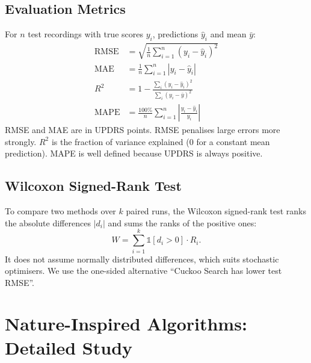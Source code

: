 \documentclass[12pt,a4paper]{article}
\numberwithin{equation}{section}
\numberwithin{table}{section}
\numberwithin{figure}{section}
\newcommand{\RMSE}{\mathrm{RMSE}}
\begin{document}
\subsection{Evaluation Metrics}
For $n$ test recordings with true scores $y_i$, predictions $\hat{y}_i$ and mean $\bar{y}$:
\begin{align}
  \RMSE &= \sqrt{\frac{1}{n}\sum_{i=1}^{n} (y_i - \hat{y}_i)^2} \\
  \mathrm{MAE} &= \frac{1}{n}\sum_{i=1}^{n} |y_i - \hat{y}_i| \\
  R^2 &= 1 - \frac{\sum_{i}(y_i - \hat{y}_i)^2}{\sum_{i}(y_i - \bar{y})^2} \\
  \mathrm{MAPE} &= \frac{100\%}{n}\sum_{i=1}^{n} \left| \frac{y_i - \hat{y}_i}{y_i} \right|
\end{align}
RMSE and MAE are in UPDRS points. RMSE penalises large errors more strongly. $R^2$ is the fraction of variance explained (0 for a constant mean prediction). MAPE is well defined because UPDRS is always positive.

\subsection{Wilcoxon Signed-Rank Test}
To compare two methods over $k$ paired runs, the Wilcoxon signed-rank test \cite{wilcoxon1945} ranks the absolute differences $|d_i|$ and sums the ranks of the positive ones:
\begin{equation}
  W = \sum_{i=1}^{k} \mathbb{1}[d_i > 0] \cdot R_i .
\end{equation}
It does not assume normally distributed differences, which suits stochastic optimisers. We use the one-sided alternative ``Cuckoo Search has lower test RMSE''.

\section{Nature-Inspired Algorithms: Detailed Study}\label{sec:nia}
\end{document}
